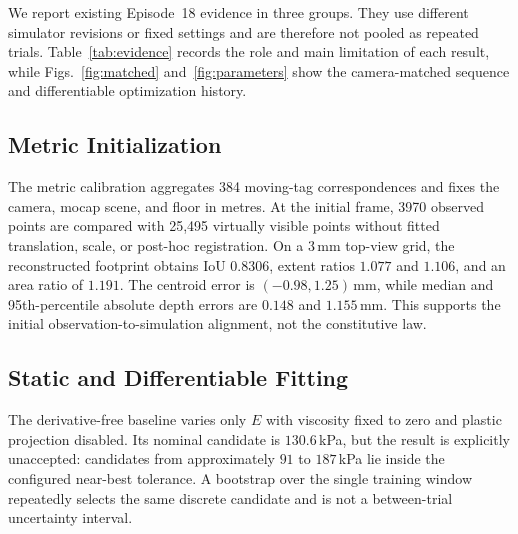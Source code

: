 We report existing Episode~18 evidence in three groups. They use different simulator revisions or fixed settings and are therefore not pooled as repeated trials. Table~\ref{tab:evidence} records the role and main limitation of each result, while Figs.~\ref{fig:matched} and~\ref{fig:parameters} show the camera-matched sequence and differentiable optimization history.

\subsection{Metric Initialization}
The metric calibration aggregates 384 moving-tag correspondences and fixes the camera, mocap scene, and floor in metres. At the initial frame, 3970 observed points are compared with 25,495 virtually visible points without fitted translation, scale, or post-hoc registration. On a 3\,mm top-view grid, the reconstructed footprint obtains IoU $0.8306$, extent ratios $1.077$ and $1.106$, and an area ratio of $1.191$. The centroid error is $(-0.98,1.25)$\,mm, while median and 95th-percentile absolute depth errors are $0.148$ and $1.155$\,mm. This supports the initial observation-to-simulation alignment, not the constitutive law.

\subsection{Static and Differentiable Fitting}
The derivative-free baseline varies only $E$ with viscosity fixed to zero and plastic projection disabled. Its nominal candidate is $130.6$\,kPa, but the result is explicitly unaccepted: candidates from approximately $91$ to $187$\,kPa lie inside the configured near-best tolerance. A bootstrap over the single training window repeatedly selects the same discrete candidate and is not a between-trial uncertainty interval.

